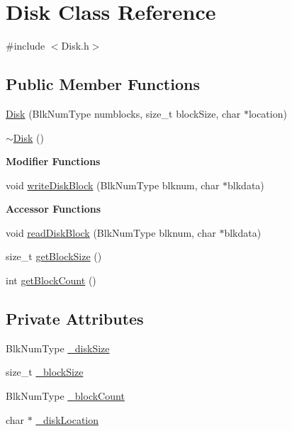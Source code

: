 \hypertarget{class_disk}{}\section{Disk Class Reference}
\label{class_disk}


{\ttfamily \#include $<$Disk.\+h$>$}

\subsection*{Public Member Functions}
\begin{DoxyCompactItemize}
\item 
\mbox{\hyperlink{class_disk_a5be49d1002da046d1890df1b088900e4}{Disk}} (Blk\+Num\+Type numblocks, size\+\_\+t block\+Size, char $\ast$location)
\item 
\mbox{\hyperlink{class_disk_a77518c808f3f5d9e902a55942542c337}{$\sim$\+Disk}} ()
\end{DoxyCompactItemize}
\begin{Indent}\textbf{ Modifier Functions}\par
\begin{DoxyCompactItemize}
\item 
void \mbox{\hyperlink{class_disk_a5d335138f56e6b87c8ebc4b6473183e7}{write\+Disk\+Block}} (Blk\+Num\+Type blknum, char $\ast$blkdata)
\end{DoxyCompactItemize}
\end{Indent}
\begin{Indent}\textbf{ Accessor Functions}\par
\begin{DoxyCompactItemize}
\item 
void \mbox{\hyperlink{class_disk_a2598cdd9013bdbb1213afa878c567daa}{read\+Disk\+Block}} (Blk\+Num\+Type blknum, char $\ast$blkdata)
\item 
size\+\_\+t \mbox{\hyperlink{class_disk_a1c149b57524fe4e7ae7c8643309e0501}{get\+Block\+Size}} ()
\item 
int \mbox{\hyperlink{class_disk_a3c61119ce5707dd4ab039201590a7c22}{get\+Block\+Count}} ()
\end{DoxyCompactItemize}
\end{Indent}
\subsection*{Private Attributes}
\begin{DoxyCompactItemize}
\item 
Blk\+Num\+Type \mbox{\hyperlink{class_disk_a6389ea8f99ad557d02685b292c23a656}{\+\_\+disk\+Size}}
\item 
size\+\_\+t \mbox{\hyperlink{class_disk_a3207de813954dad3e2547c7a892a04a7}{\+\_\+block\+Size}}
\item 
Blk\+Num\+Type \mbox{\hyperlink{class_disk_a35a2900e2a8d3b567ef7280d3c475eac}{\+\_\+block\+Count}}
\item 
char $\ast$ \mbox{\hyperlink{class_disk_a04bd92b804d0c07e87a9277fa647c972}{\+\_\+disk\+Location}}
\end{DoxyCompactItemize}


